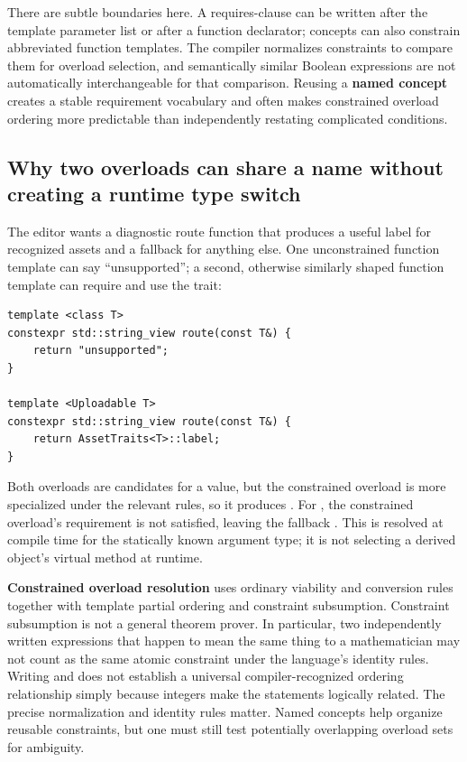 There are subtle boundaries here. A requires-clause can be written after the template parameter list or after a function declarator; concepts can also constrain abbreviated function templates. The compiler normalizes constraints to compare them for overload selection, and semantically similar Boolean expressions are not automatically interchangeable for that comparison. Reusing a \textbf{named concept} creates a stable requirement vocabulary and often makes constrained overload ordering more predictable than independently restating complicated conditions.

\subsection{Why two overloads can share a name without creating a runtime type switch}\label{05-engine-i-ch005-why-two-overloads-can-share-a-name-without-creating-a-runtime-type-switch}

\hypertarget{05-engine-i-ch005-why-two-overloads-can-share-a-name-without-creating-a-runtime-type-switch}{}

The editor wants a diagnostic route function that produces a useful label for recognized assets and a fallback for anything else. One unconstrained function template can say ``unsupported''; a second, otherwise similarly shaped function template can require  and use the trait:

\begin{verbatim}
template <class T>
constexpr std::string_view route(const T&) {
    return "unsupported";
}

template <Uploadable T>
constexpr std::string_view route(const T&) {
    return AssetTraits<T>::label;
}
\end{verbatim}

Both overloads are candidates for a  value, but the constrained overload is more specialized under the relevant rules, so it produces . For , the constrained overload's requirement is not satisfied, leaving the fallback . This is resolved at compile time for the statically known argument type; it is not selecting a derived object's virtual method at runtime.

\textbf{Constrained overload resolution} uses ordinary viability and conversion rules together with template partial ordering and constraint subsumption. Constraint subsumption is not a general theorem prover. In particular, two independently written expressions that happen to mean the same thing to a mathematician may not count as the same atomic constraint under the language's identity rules. Writing  and  does not establish a universal compiler-recognized ordering relationship simply because integers make the statements logically related. The precise normalization and identity rules matter. Named concepts help organize reusable constraints, but one must still test potentially overlapping overload sets for ambiguity.

